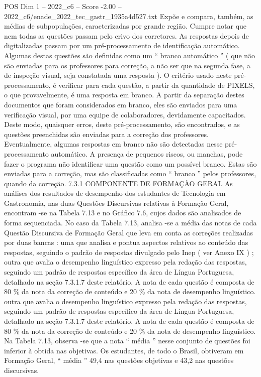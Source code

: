\begin{textsample}{POS Dim 1 – 2022\_c6 – Score -2.00 – 2022\_c6/enade\_2022\_tec\_gastr\_1935a4d527.txt}
Expõe e compara, também, as médias de subpopulações, caracterizadas por grande região.
Cumpre notar que nem todas as questões passam pelo crivo dos corretores.
As respostas depois de digitalizadas passam por um pré-processamento de identificação automático.
Algumas destas questões são definidas como um “ branco automático ” ( que não são enviadas para os professores para correção, a não ser que na segunda fase, a de inspeção visual, seja constatada uma resposta ).
O critério usado neste pré-processamento, é verificar para cada questão, a partir da quantidade de PIXELS, o que provavelmente, é uma resposta em branco.
A partir da separação destes documentos que foram considerados em branco, eles são enviados para uma verificação visual, por uma equipe de colaboradores, devidamente capacitados.
Deste modo, quaisquer erros, deste pré-processamento, são encontrados, e as questões preenchidas são enviadas para a correção dos professores.
Eventualmente, algumas respostas em branco não são detectadas nesse pré-processamento automático.
A presença de pequenos riscos, ou manchas, pode fazer o programa não identificar uma questão como um possível branco.
Estas são enviadas para a correção, mas são classificadas como “ branco ” pelos professores, quando da correção. 7.3.1 COMPONENTE DE FORMAÇÃO GERAL As análises dos resultados de desempenho dos estudantes de Tecnologia em Gastronomia, nas duas Questões Discursivas relativas à Formação Geral, encontram -se na Tabela 7.13 e no Gráfico 7.6, cujos dados são analisados de forma sequenciada.
No caso da Tabela 7.13, analisa -se a média das notas de cada Questão Discursiva de Formação Geral que leva em conta as correções realizadas por duas bancas : uma que analisa e pontua aspectos relativos ao conteúdo das respostas, seguindo o padrão de respostas divulgado pelo Inep ( ver Anexo IX ) ; outra que avalia o desempenho linguístico expresso pela redação das respostas, seguindo um padrão de respostas específico da área de Língua Portuguesa, detalhado na seção 7.3.1.7 deste relatório.
A nota de cada questão é composta de 80 \% da nota da correção de conteúdo e 20 \% da nota de desempenho linguístico. outra que avalia o desempenho linguístico expresso pela redação das respostas, seguindo um padrão de respostas específico da área de Língua Portuguesa, detalhado na seção 7.3.1.7 deste relatório.
A nota de cada questão é composta de 80 \% da nota da correção de conteúdo e 20 \% da nota de desempenho linguístico.
Na Tabela 7.13, observa -se que a nota “ média ” nesse conjunto de questões foi inferior à obtida nas objetivas.
Os estudantes, de todo o Brasil, obtiveram em Formação Geral, “ média ” 49,4 nas questões objetivas e 43,2 nas questões discursivas.

\end{textsample}
